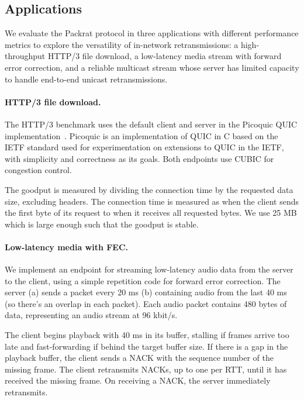 \subsection{Applications}
\label{sec:packrat:implementation:applications}

We evaluate the Packrat protocol in three applications with different performance
metrics to explore the versatility of in-network retransmissions:
a high-throughput HTTP/3 file download, a low-latency media stream with forward
error correction, and a reliable multicast stream whose server has limited
capacity to handle end-to-end unicast retransmissions.

\paragraph{HTTP/3 file download.}

The HTTP/3 benchmark uses the default client and server in the Picoquic QUIC
implementation~\cite{picoquic}. Picoquic is an implementation of QUIC in C
based on the IETF standard used for experimentation on extensions to QUIC in
the IETF, with simplicity and correctness as its goals. Both endpoints use
CUBIC for congestion control.

The goodput is measured by dividing the connection time by the requested data
size, excluding headers.
The connection time is measured as when the client sends the first
byte of its request to when it receives all requested bytes.
We use 25 MB which is large enough such that the goodput is stable.

\paragraph{Low-latency media with FEC.}

We implement an endpoint for streaming low-latency audio data from the server
to the client, using a simple repetition code for forward error correction.
The server (a) sends a packet every 20 ms
(b) containing audio from the last 40 ms (so there's an overlap in each
packet). Each audio packet contains 480 bytes of data, representing an audio
stream at 96 kbit/s.

The client begins playback with 40 ms in its buffer, stalling if frames arrive
too late and fast-forwarding if behind the target buffer size.
If there is a gap in the
playback buffer, the client sends a NACK with the sequence number of the
missing frame. The client retransmits NACKs, up to one per RTT, until it has
received the missing frame. On receiving a NACK, the server immediately
retransmits.

